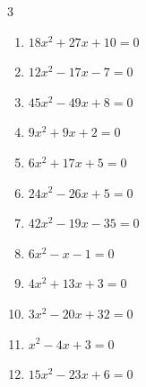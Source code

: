 \begin{multicols}{3}
\begin{enumerate}
  \item $18x^{2}+27x+10=0$


\columnbreak %

\resetques

  \item $12x^{2}-17x-7=0$


  \item $45x^{2}-49x+8=0$


  \item $9x^{2}+9x+2=0$


  \item $6x^{2}+17x+5=0$


  \item $24x^{2}-26x+5=0$


  \item $42x^{2}-19x-35=0$


  \item $6x^{2}-x-1=0$


  \item $4x^{2}+13x+3=0$


  \item $3x^{2}-20x+32=0$


  \item $x^{2}-4x+3=0$

        \phantom{$\displaystyle x=1,\; 3$}

\columnbreak %

  \item $15x^{2}-23x+6=0$



\end{enumerate}
\end{multicols}
